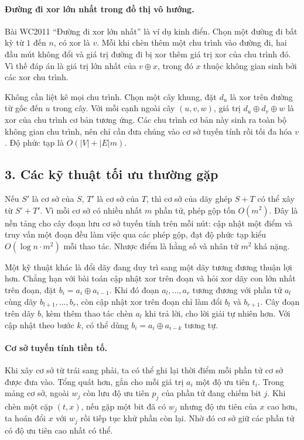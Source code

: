 \documentclass[11pt]{article}
\begin{document}
\paragraph{Đường đi xor lớn nhất trong đồ thị vô hướng.}
Bài WC2011 ``Đường đi xor lớn nhất'' là ví dụ kinh điển. Chọn một đường đi bất
kỳ từ \(1\) đến \(n\), có xor là \(v\). Mỗi khi chèn thêm một chu trình vào
đường đi, hai đầu mút không đổi và giá trị đường đi bị xor thêm giá trị xor của
chu trình đó. Vì thế đáp án là giá trị lớn nhất của \(v\oplus x\), trong đó
\(x\) thuộc không gian sinh bởi các xor chu trình.

Không cần liệt kê mọi chu trình. Chọn một cây khung, đặt \(d_u\) là xor trên
đường từ gốc đến \(u\) trong cây. Với mỗi cạnh ngoài cây \((u,v,w)\), giá trị
\(d_u\oplus d_v\oplus w\) là xor của chu trình cơ bản tương ứng. Các chu trình
cơ bản này sinh ra toàn bộ không gian chu trình, nên chỉ cần đưa chúng vào cơ
sở tuyến tính rồi tối đa hóa \(v\). Độ phức tạp là
\(O(|V|+|E|m)\).

\subsection*{3. Các kỹ thuật tối ưu thường gặp}

Nếu \(S'\) là cơ sở của \(S\), \(T'\) là cơ sở của \(T\), thì cơ sở của dãy ghép
\(S+T\) có thể xây từ \(S'+T'\). Vì mỗi cơ sở có nhiều nhất \(m\) phần tử, phép
gộp tốn \(O(m^2)\). Đây là nền tảng cho cây đoạn lưu cơ sở tuyến tính trên mỗi
nút: cập nhật một điểm và truy vấn một đoạn đều làm việc qua các phép gộp, đạt
độ phức tạp kiểu \(O(\log n\cdot m^2)\) mỗi thao tác. Nhược điểm là hằng số và
nhân tử \(m^2\) khá nặng.

Một kỹ thuật khác là đổi dãy đang duy trì sang một dãy tương đương thuận lợi
hơn. Chẳng hạn với bài toán cập nhật xor trên đoạn và hỏi xor dãy con lớn nhất
trên đoạn, đặt \(b_i=a_i\oplus a_{i-1}\). Khi đó đoạn \(a_l,\ldots,a_r\)
tương đương với phần tử \(a_l\) cùng dãy \(b_{l+1},\ldots,b_r\), còn cập nhật
xor trên đoạn chỉ làm đổi \(b_l\) và \(b_{r+1}\). Cây đoạn trên dãy \(b\), kèm
thêm thao tác chèn \(a_l\) khi trả lời, cho lời giải tự nhiên hơn. Với cập nhật
theo bước \(k\), có thể dùng \(b_i=a_i\oplus a_{i-k}\) tương tự.

\paragraph{Cơ sở tuyến tính tiền tố.}
Khi xây cơ sở từ trái sang phải, ta có thể ghi lại thời điểm mỗi phần tử cơ sở
được đưa vào. Tổng quát hơn, gắn cho mỗi giá trị \(a_i\) một độ ưu tiên
\(t_i\). Trong mảng cơ sở, ngoài \(w_j\) còn lưu độ ưu tiên \(p_j\) của phần tử
đang chiếm bit \(j\). Khi chèn một cặp \((t,x)\), nếu gặp một bit đã có
\(w_j\) nhưng độ ưu tiên của \(x\) cao hơn, ta hoán đổi \(x\) với \(w_j\) rồi
tiếp tục khử phần còn lại. Nhờ đó cơ sở giữ các phần tử có độ ưu tiên cao nhất
có thể.
\end{document}

